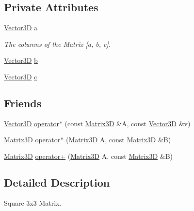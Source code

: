 \subsection*{Private Attributes}
\begin{DoxyCompactItemize}
\item 
\mbox{\hyperlink{classVector3D}{Vector3D}} \mbox{\hyperlink{classlinalg_1_1Matrix3D_a33667283fe3c4bbac6d4f78eae2af3b6}{a}}
\begin{DoxyCompactList}\small\item\em The columns of the Matrix \mbox{[}a, b, c\mbox{]}. \end{DoxyCompactList}\item 
\mbox{\hyperlink{classVector3D}{Vector3D}} \mbox{\hyperlink{classlinalg_1_1Matrix3D_acf0cd214420329fe18c902be95da0b23}{b}}
\item 
\mbox{\hyperlink{classVector3D}{Vector3D}} \mbox{\hyperlink{classlinalg_1_1Matrix3D_abe82e945bf73f0d0f6f28c1749e2c7e3}{c}}
\end{DoxyCompactItemize}
\subsection*{Friends}
\begin{DoxyCompactItemize}
\item 
\mbox{\hyperlink{classVector3D}{Vector3D}} \mbox{\hyperlink{classlinalg_1_1Matrix3D_a7ae064396881469e4d815cfba5804a2e}{operator$\ast$}} (const \mbox{\hyperlink{classlinalg_1_1Matrix3D}{Matrix3D}} \&A, const \mbox{\hyperlink{classVector3D}{Vector3D}} \&v)
\item 
\mbox{\hyperlink{classlinalg_1_1Matrix3D}{Matrix3D}} \mbox{\hyperlink{classlinalg_1_1Matrix3D_a701c3381ba551de2652b9f021a8454ec}{operator$\ast$}} (\mbox{\hyperlink{classlinalg_1_1Matrix3D}{Matrix3D}} A, const \mbox{\hyperlink{classlinalg_1_1Matrix3D}{Matrix3D}} \&B)
\item 
\mbox{\hyperlink{classlinalg_1_1Matrix3D}{Matrix3D}} \mbox{\hyperlink{classlinalg_1_1Matrix3D_a54929d88410f4beedd5ef7ef3ba8cffc}{operator+}} (\mbox{\hyperlink{classlinalg_1_1Matrix3D}{Matrix3D}} A, const \mbox{\hyperlink{classlinalg_1_1Matrix3D}{Matrix3D}} \&B)
\end{DoxyCompactItemize}


\subsection{Detailed Description}
Square 3x3 Matrix. 

